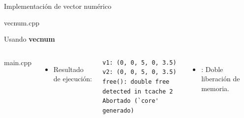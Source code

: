 
\begin{frame}[t,fragile]{Implementación de vector numérico}
\begin{block}{vecnum.cpp}

\end{block}
\end{frame}

\begin{frame}[t, fragile]{Usando \textbf{vecnum}}
\begin{columns}[T]

\begin{block}{main.cpp}

\end{block}

\pause
{}
\begin{itemize}
\item Resultado de ejecución:
\end{itemize}
\begin{lstlisting}[style=terminal]
v1: (0, 0, 5, 0, 3.5)
v2: (0, 0, 5, 0, 3.5)
free(): double free detected in tcache 2
Abortado (`core' generado)
\end{lstlisting}
\begin{itemize}
\item {}: Doble liberación de memoria.
\end{itemize}
\end{columns}

\end{frame}

